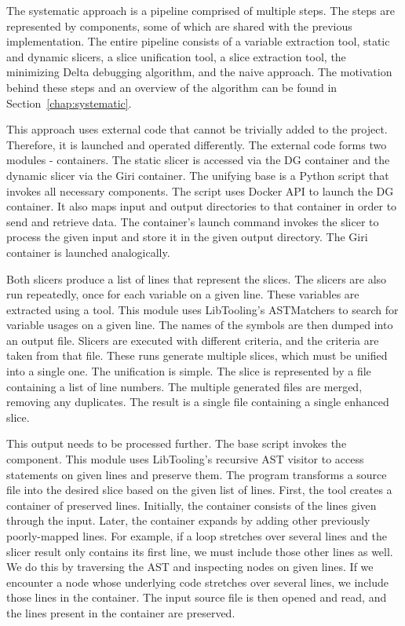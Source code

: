 The systematic approach is a pipeline comprised of multiple steps. 
The steps are represented by components, some of which are shared with 
the previous implementation. 
The entire pipeline consists of a variable extraction tool, static and 
dynamic slicers, a slice unification tool, a slice extraction tool, 
the minimizing Delta debugging algorithm, and the naive approach. 
The motivation behind these steps and an overview of the algorithm can be 
found in Section~\ref{chap:systematic}.

This approach uses external code that cannot be trivially added to 
the project.
Therefore, it is launched and operated differently.
The external code forms two modules - containers. 
The static slicer is accessed via the DG container and the dynamic slicer 
via the Giri container. 
The unifying base is a Python script that invokes all necessary components.
The script uses Docker API to launch the DG container.
It also maps input and output directories to that container in order to send 
and retrieve data.
The container's launch command invokes the slicer to process the given input 
and store it in the given output directory.
The Giri container is launched analogically.

Both slicers produce a list of lines that represent the slices. 
The slicers are also run repeatedly, once for each variable on a given line. 
These variables are extracted using a  tool. 
This module uses LibTooling's ASTMatchers to search for variable usages on 
a given line. 
The names of the symbols are then dumped into an output file. 
Slicers are executed with different criteria, and the criteria are taken 
from that file.
These runs generate multiple slices, which must be unified into a single one. 
The unification is simple. 
The slice is represented by a file containing a list of line numbers. 
The multiple generated files are merged, removing any duplicates. 
The result is a single file containing a single enhanced slice. 

This output needs to be processed further. 
The base script invokes the  component. 
This module uses LibTooling's recursive AST visitor to access statements on 
given lines and preserve them. 
The program transforms a source file into the desired slice based on 
the given list of lines. 
First, the tool creates a container of preserved lines. 
Initially, the container consists of the lines given through the input. 
Later, the container expands by adding other previously poorly-mapped lines. 
For example, if a  loop stretches over several lines and 
the slicer result only contains its first line, we must include those other 
lines as well. 
We do this by traversing the AST and inspecting nodes on given lines. 
If we encounter a node whose underlying code stretches over several lines, 
we include those lines in the container. 
The input source file is then opened and read, and the lines present in 
the container are preserved. 

